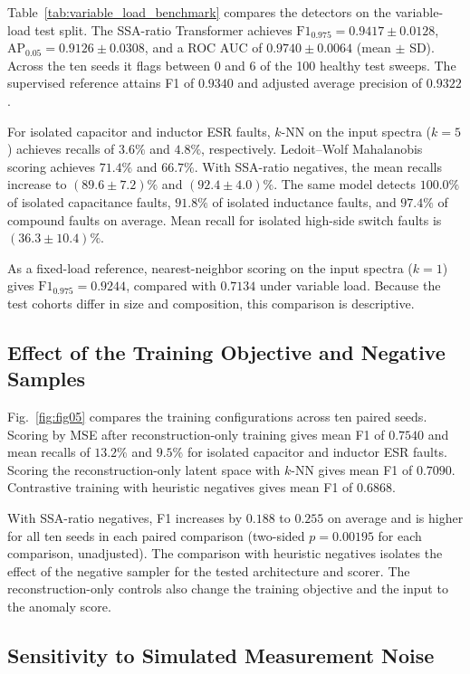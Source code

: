 \documentclass[journal]{IEEEtran}
\newcommand{\AP}{\mathrm{AP}_{0.05}}
\newcommand{\Fmain}{\mathrm{F1}_{0.975}}
\begin{document}
Table~\ref{tab:variable_load_benchmark} compares the detectors on the variable-load test split. The SSA-ratio Transformer achieves $\Fmain=0.9417\pm0.0128$, $\AP=0.9126\pm0.0308$, and a ROC AUC of $0.9740\pm0.0064$ (mean $\pm$ SD). Across the ten seeds it flags between 0 and 6 of the 100 healthy test sweeps. The supervised reference attains F1 of $0.9340$ and adjusted average precision of $0.9322$.

For isolated capacitor and inductor ESR faults, $k$-NN on the input spectra ($k=5$) achieves recalls of $3.6\%$ and $4.8\%$, respectively. Ledoit--Wolf Mahalanobis scoring achieves $71.4\%$ and $66.7\%$. With SSA-ratio negatives, the mean recalls increase to $(89.6\pm7.2)\%$ and $(92.4\pm4.0)\%$. The same model detects $100.0\%$ of isolated capacitance faults, $91.8\%$ of isolated inductance faults, and $97.4\%$ of compound faults on average. Mean recall for isolated high-side switch faults is $(36.3\pm10.4)\%$.

As a fixed-load reference, nearest-neighbor scoring on the input spectra ($k=1$) gives $\Fmain=0.9244$, compared with $0.7134$ under variable load. Because the test cohorts differ in size and composition, this comparison is descriptive.



\subsection{Effect of the Training Objective and Negative Samples}\label{sec:6_2}

Fig.~\ref{fig:fig05} compares the training configurations across ten paired seeds. Scoring by MSE after reconstruction-only training gives mean F1 of $0.7540$ and mean recalls of $13.2\%$ and $9.5\%$ for isolated capacitor and inductor ESR faults. Scoring the reconstruction-only latent space with $k$-NN gives mean F1 of $0.7090$. Contrastive training with heuristic negatives gives mean F1 of $0.6868$.

With SSA-ratio negatives, F1 increases by $0.188$ to $0.255$ on average and is higher for all ten seeds in each paired comparison (two-sided $p=0.00195$ for each comparison, unadjusted). The comparison with heuristic negatives isolates the effect of the negative sampler for the tested architecture and scorer. The reconstruction-only controls also change the training objective and the input to the anomaly score.

\subsection{Sensitivity to Simulated Measurement Noise}\label{sec:6_4}
\end{document}
